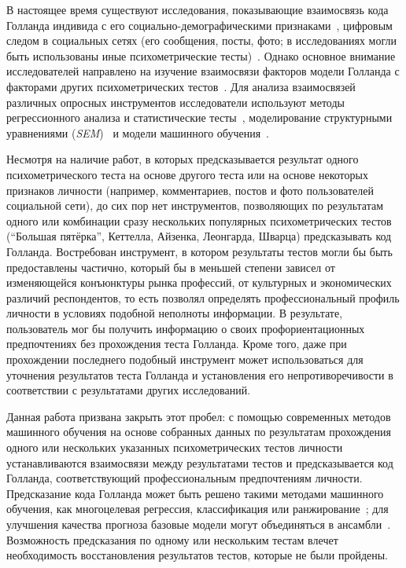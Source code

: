 В настоящее время существуют исследования, показывающие взаимосвязь кода Голланда индивида с его социально-демографическими признаками~\cite{Bogacheva}, цифровым следом в социальных сетях (его сообщения, посты, фото; в исследованиях могли быть использованы иные психометрические тесты)~\cite{Chekalev, Ivaschenko, Stoliarova, Oliseenko, Stankevich, Titov, Basaran}. Однако основное внимание исследователей направлено на изучение взаимосвязи факторов модели Голланда с факторами других психометрических тестов~\cite{Mason, Hurtado, Batista, Usslepp, Schuerger, Yamashita, Martins}. Для анализа взаимосвязей различных опросных инструментов исследователи используют методы регрессионного анализа и статистические тесты~\cite{Hurtado, Ivaschenko, Stoliarova}, моделирование структурными уравнениями (\emph{SEM})~\cite{Martins, Chu} и модели машинного обучения~\cite{Usslepp, Silva, Song, Bogacheva, Oliseenko, Stankevich, Titov, Basaran}.

Несмотря на наличие работ, в которых предсказывается результат одного психометрического теста на основе другого теста или на основе некоторых признаков личности (например, комментариев, постов и фото пользователей социальной сети), до сих пор нет инструментов, позволяющих по результатам одного или комбинации сразу нескольких популярных психометрических тестов (\enquote{Большая пятёрка}, Кеттелла, Айзенка, Леонгарда, Шварца) предсказывать код Голланда. Востребован инструмент, в котором результаты тестов могли бы быть предоставлены частично, который бы в меньшей степени зависел от изменяющейся конъюнктуры рынка профессий, от культурных и экономических различий респондентов, то есть позволял определять профессиональный профиль личности в условиях подобной неполноты информации. В результате, пользователь мог бы получить информацию о своих профориентационных предпочтениях без прохождения теста Голланда. Кроме того, даже при прохождении последнего подобный инструмент может использоваться для уточнения результатов теста Голланда и установления его непротиворечивости в соответствии с результатами других исследований.

Данная работа призвана закрыть этот пробел: с помощью современных методов машинного обучения на основе собранных данных по результатам прохождения одного или нескольких указанных психометрических тестов личности устанавливаются взаимосвязи между результатами тестов и предсказывается код Голланда, соответствующий профессиональным предпочтениям личности. Предсказание кода Голланда может быть решено такими методами машинного обучения, как многоцелевая регрессия, классификация или ранжирование~\cite{Bishop}; для улучшения качества прогноза базовые модели могут объединяться в ансамбли~\cite{ZhangC, Bischl}. Возможность предсказания по одному или нескольким тестам влечет необходимость восстановления результатов тестов, которые не были пройдены.

